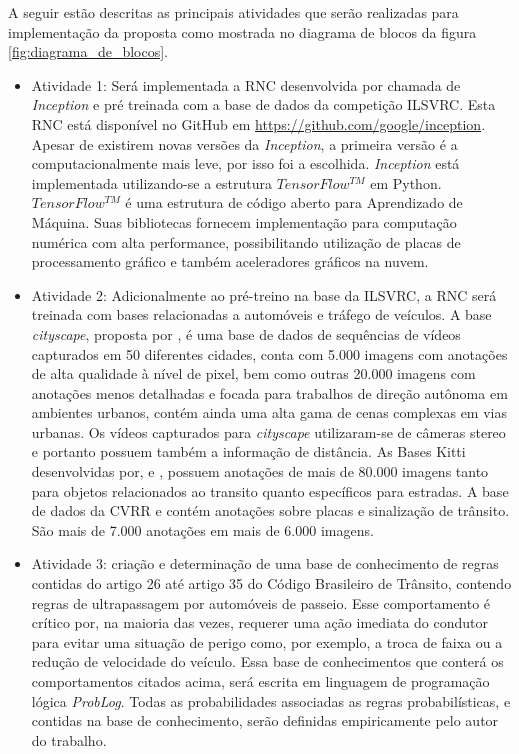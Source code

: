 \documentclass[
	12pt,				%
    oneside,			%
	a4paper,			%
	english,			%
	french,				%
	spanish,			%
	brazil,				%
	]{abntex2}
\begin{document}
A seguir estão descritas as principais atividades que serão realizadas para implementação da proposta como mostrada no diagrama de blocos da figura \ref{fig:diagrama_de_blocos}. 


\begin{itemize}
   

 \item Atividade 1: Será implementada a RNC desenvolvida por  chamada de \textit{Inception} e pré treinada com a base de dados da competição ILSVRC. Esta RNC está disponível no GitHub em \url{https://github.com/google/inception}. Apesar de existirem novas versões da \textit{Inception}, a primeira versão é a computacionalmente mais leve, por isso foi a escolhida. \textit{Inception} está implementada utilizando-se a estrutura $TensorFlow^{TM}$ em Python. $TensorFlow^{TM}$ é uma estrutura de código aberto para Aprendizado de Máquina. Suas bibliotecas fornecem implementação para computação numérica com alta performance, possibilitando utilização de placas de processamento gráfico e também aceleradores gráficos na nuvem. 
 

 \item Atividade 2: Adicionalmente ao pré-treino na base da ILSVRC, a RNC será treinada com bases relacionadas a automóveis e tráfego de veículos.\newline
 A base \textit{cityscape}, proposta por , é uma base de dados de sequências de vídeos capturados em 50 diferentes cidades, conta com 5.000 imagens com anotações de alta qualidade à nível de pixel, bem como outras 20.000 imagens com anotações menos detalhadas e focada para trabalhos de direção autônoma em ambientes urbanos, contém ainda uma alta gama de cenas complexas em vias urbanas. Os vídeos capturados para \textit{cityscape} utilizaram-se de câmeras stereo e portanto possuem também a informação de distância.\newline
 As Bases Kitti desenvolvidas por,  e , possuem anotações de mais de 80.000 imagens tanto para objetos relacionados ao transito quanto específicos para estradas.\newline
 A base de dados da CVRR  e  contém anotações sobre placas e sinalização de trânsito. São mais de 7.000 anotações em mais de 6.000 imagens.
 
 \item Atividade 3: criação e determinação de uma base de conhecimento de regras contidas do artigo 26 até artigo 35 do Código Brasileiro de Trânsito, contendo regras de ultrapassagem por automóveis de passeio. Esse comportamento é crítico por, na maioria das vezes, requerer uma ação imediata do condutor para evitar uma situação de perigo como, por exemplo, a troca de faixa ou a redução de velocidade do veículo. Essa base de conhecimentos que conterá os comportamentos citados acima, será escrita em linguagem de programação lógica \textit{ProbLog}. Todas as probabilidades associadas as regras probabilísticas, e contidas na base de conhecimento, serão definidas empiricamente pelo autor do trabalho.  
 

\end{itemize}
\end{document}
